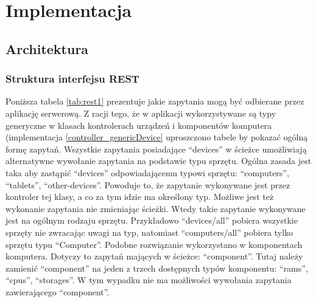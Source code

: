 \chapter{Implementacja}

\section{Architektura}


\subsection{Struktura interfejsu REST}
Poniższa tabela \ref{tab:rest1} prezentuje jakie zapytania mogą być odbierane przez aplikację serwerową. Z racji tego, że w aplikacji wykorzystywane są typy generyczne w klasach kontrolerach urządzeń i komponentów komputera (implementacja \ref{controller_genericDevice} uproszczono tabele by pokazać ogólną formę zapytań. Wszystkie zapytania posiadające "`devices"' w ścieżce umożliwiają alternatywne wywołanie zapytania na podstawie typu sprzętu. Ogólna zasada jest taka aby zastąpić "`devices"' odpowiadającemu typowi sprzętu: "`computers"', "`tablets"', "`other-devices"'. Powoduje to, że zapytanie wykonywane jest przez kontroler tej klasy, a co za tym idzie ma określony typ. Możliwe jest też wykonanie zapytania nie zmieniając ścieżki. Wtedy takie zapytanie wykonywane jest na ogólnym rodzaju sprzętu. Przykładowo "`devices/all"' pobiera wszystkie sprzęty nie zwracając uwagi na typ, natomiast "`computers/all"' pobiera tylko sprzętu typu "`Computer"'. Podobne rozwiązanie wykorzystano w komponentach komputera. Dotyczy to zapytań mających w ścieżce: "`component"'. Tutaj należy zamienić "`component"' na jeden z trzech dostępnych typów komponentu: "`rams"', "`cpus"', "`storages"'. W tym wypadku nie ma możliwości wywołania zapytania zawierającego "`component"'.

